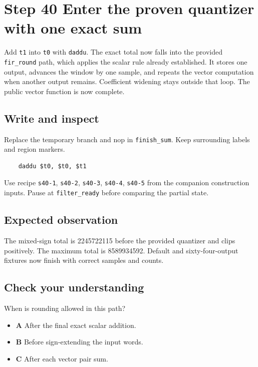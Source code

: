 \section{Step 40 Enter the proven quantizer with one exact sum}\label{fir-s40}

Add \texttt{t1} into \texttt{t0} with \texttt{daddu}. The exact total now falls into the provided \texttt{fir\_round} path, which applies the scalar rule already established. It stores one output, advances the window by one sample, and repeats the vector computation when another output remains. Coefficient widening stays outside that loop. The public vector function is now complete.

\subsection{Write and inspect}
Replace the temporary branch and nop in \texttt{finish\_sum}. Keep surrounding labels and region markers.

\begin{verbatim}
    daddu $t0, $t0, $t1
\end{verbatim}
Use recipe \texttt{s40-1}, \texttt{s40-2}, \texttt{s40-3}, \texttt{s40-4}, \texttt{s40-5} from the companion construction inputs. Pause at \texttt{filter\_ready} before comparing the partial state.

\subsection{Expected observation}
The mixed-sign total is 2245722115 before the provided quantizer and clips positively. The maximum total is 8589934592. Default and sixty-four-output fixtures now finish with correct samples and counts.

\subsection{Check your understanding}
When is rounding allowed in this path?

\begin{itemize}
\item \textbf{A} After the final exact scalar addition.
\item \textbf{B} Before sign-extending the input words.
\item \textbf{C} After each vector pair sum.
\end{itemize}
